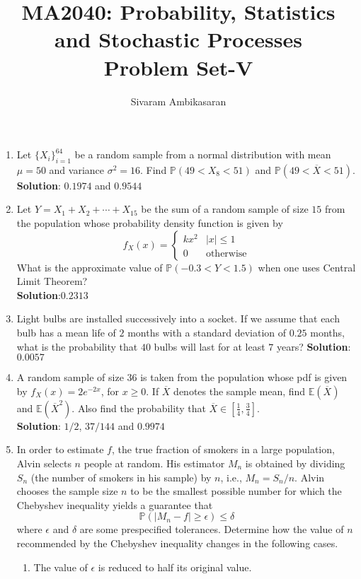 \documentclass{article}
\title{MA2040: Probability, Statistics and Stochastic Processes\\
Problem Set-V}
\author{Sivaram Ambikasaran}
\newcommand{\abs}[1]{\displaystyle\left\lvert#1\right\rvert}
\newcommand{\Pb}{\mathbb{P}}
\newcommand{\Eb}{\mathbb{E}}
\newcommand{\soln}[1]{\textbf{Solution}:#1}
\newcommand{\bkt}[1]{\left(#1\right)}
\begin{document}
	\maketitle
	\begin{enumerate}
		\item
		Let $\{X_i\}_{i=1}^{64}$ be a random sample from a normal distribution with mean $\mu = 50$ and variance $\sigma^2=16$. Find $\Pb\bkt{49 < X_8 < 51}$ and $\Pb\bkt{49 < \overline{X} < 51}$.\\
		\soln{
		$0.1974$ and $0.9544$
		}
		\item
		Let $Y = X_1+X_2+\cdots+X_15$ be the sum of a random sample of size $15$ from the population whose probability density function is given by
		$$f_X(x) = \begin{cases}
		kx^2 & \abs{x} \leq 1\\
		0 & \text{otherwise}
		\end{cases}$$
		What is the approximate value of $\Pb\bkt{-0.3<Y<1.5}$ when one uses Central Limit Theorem?\\
		\soln{$0.2313$}
		\item
		Light bulbs are installed successively into a socket. If we assume that each bulb has a mean life of $2$ months with a standard deviation of $0.25$ months, what is the probability that $40$ bulbs will last for at least $7$ years?
		\soln{$0.0057$}
		\item
		A random sample of size $36$ is taken from the population whose pdf is given by $f_X(x) = 2e^{-2x}$, for $x \geq 0$. If $\overline{X}$ denotes the sample mean, find $\Eb\bkt{\overline{X}}$ and $\Eb\bkt{\overline{X}^2}$. Also find the probability that $\overline{X} \in \left[\frac14,\frac34\right]$.\\
		\soln{
		$1/2$, $37/144$ and $0.9974$
		}
		\item
		In order to estimate $f$, the true fraction of smokers in a large population, Alvin selects $n$ people at random. His estimator $M_n$ is obtained by dividing $S_n$ (the number of smokers in his sample) by $n$, i.e., $M_n=S_n/n$. Alvin chooses the sample size $n$ to be the smallest possible number for which the Chebyshev inequality yields a guarantee that 
		$$\Pb \bkt{\abs{M_n-f} \geq \epsilon} \leq \delta$$
		where $\epsilon$ and $\delta$ are some prespecified tolerances. Determine how the value of $n$ recommended by the Chebyshev inequality changes in the following cases.
		\begin{enumerate}
			\item
			The value of $\epsilon$ is reduced to half its original value.\\

\end{enumerate}
\end{enumerate}
\end{document}
